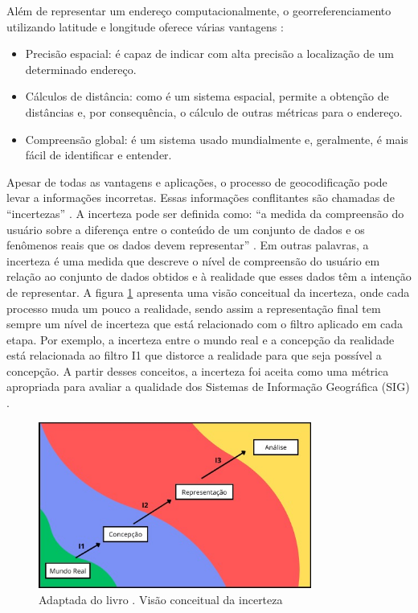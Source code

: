 Além de representar um endereço computacionalmente, o georreferenciamento utilizando latitude e longitude oferece várias vantagens \cite{longley2013}:

\begin{itemize}
   \item Precisão espacial: é capaz de indicar com alta precisão a localização de um determinado endereço.
   \item Cálculos de distância: como é um sistema espacial, permite a obtenção de distâncias e, por consequência, o cálculo de outras métricas para o endereço.
   \item Compreensão global: é um sistema usado mundialmente e, geralmente, é mais fácil de identificar e entender.
\end{itemize}

Apesar de todas as vantagens e aplicações, o processo de geocodificação pode levar a informações incorretas. Essas informações conflitantes são chamadas de ``incertezas'' \cite{longley2013}. A incerteza pode ser definida como: ``a medida da compreensão do usuário sobre a diferença entre o conteúdo de um conjunto de dados e os fenômenos reais que os dados devem representar'' \cite{longley2013}. Em outras palavras, a incerteza é uma medida que descreve o nível de compreensão do usuário em relação ao conjunto de dados obtidos e à realidade que esses dados têm a intenção de representar. A figura \ref{fig:incerteza} apresenta uma visão conceitual da incerteza, onde cada processo muda um pouco a realidade, sendo assim a representação final tem sempre um nível de incerteza que está relacionado com o filtro aplicado em cada etapa. Por exemplo, a incerteza entre o mundo real e a concepção da realidade está relacionada ao filtro I1 que distorce a realidade para que seja possível a concepção.  A partir desses conceitos, a incerteza foi aceita como uma métrica apropriada para avaliar a qualidade dos Sistemas de Informação Geográfica (SIG) \cite{longley2013}.

\begin{figure}[ht]
   \centering
   \includegraphics[width=0.8\textwidth]{Figuras/incertezaMeu.jpeg}
   \caption{Adaptada do livro \cite{longley2013}. Visão conceitual da incerteza}
   \label{fig:incerteza}
\end{figure}

